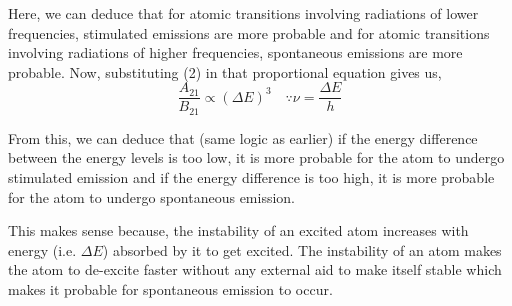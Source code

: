 \documentclass[12pt]{article}
\begin{document}
Here, we can deduce that for atomic transitions involving radiations of lower frequencies, stimulated emissions are more probable and for atomic transitions involving radiations of higher frequencies, spontaneous emissions are more probable. Now, substituting (2) in that proportional equation gives us,
\begin{equation}
    \frac{A_{21}}{B_{21}} \propto (\Delta E)^{3} \quad \because \nu = \frac{\Delta E}{h}
\end{equation}

From this, we can deduce that (same logic as earlier) if the energy difference between the energy levels is too low, it is more probable for the atom to undergo stimulated emission and if the energy difference is too high, it is more probable for the atom to undergo spontaneous emission. \vspace{.2cm}

This makes sense because, the instability of an excited atom increases with energy (i.e. $\Delta E$) absorbed by it to get excited. The instability of an atom makes the atom to de-excite faster without any external aid to make itself stable which makes it probable for spontaneous emission to occur.
\end{document}
